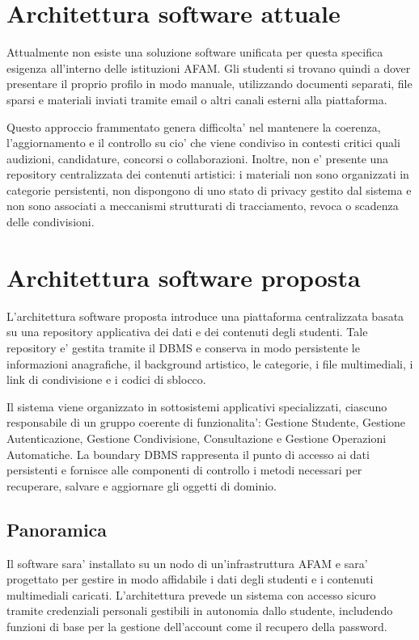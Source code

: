 \documentclass[12pt,a4paper]{article}
\begin{document}
\section{Architettura software attuale}
Attualmente non esiste una soluzione software unificata per questa specifica esigenza all'interno delle istituzioni AFAM. Gli studenti si trovano quindi a dover presentare il proprio profilo in modo manuale, utilizzando documenti separati, file sparsi e materiali inviati tramite email o altri canali esterni alla piattaforma.

Questo approccio frammentato genera difficolta' nel mantenere la coerenza, l'aggiornamento e il controllo su cio' che viene condiviso in contesti critici quali audizioni, candidature, concorsi o collaborazioni. Inoltre, non e' presente una repository centralizzata dei contenuti artistici: i materiali non sono organizzati in categorie persistenti, non dispongono di uno stato di privacy gestito dal sistema e non sono associati a meccanismi strutturati di tracciamento, revoca o scadenza delle condivisioni.

\section{Architettura software proposta}
L'architettura software proposta introduce una piattaforma centralizzata basata su una repository applicativa dei dati e dei contenuti degli studenti. Tale repository e' gestita tramite il DBMS e conserva in modo persistente le informazioni anagrafiche, il background artistico, le categorie, i file multimediali, i link di condivisione e i codici di sblocco.

Il sistema viene organizzato in sottosistemi applicativi specializzati, ciascuno responsabile di un gruppo coerente di funzionalita': Gestione Studente, Gestione Autenticazione, Gestione Condivisione, Consultazione e Gestione Operazioni Automatiche. La boundary DBMS rappresenta il punto di accesso ai dati persistenti e fornisce alle componenti di controllo i metodi necessari per recuperare, salvare e aggiornare gli oggetti di dominio.

\subsection{Panoramica}
Il software sara' installato su un nodo di un'infrastruttura AFAM e sara' progettato per gestire in modo affidabile i dati degli studenti e i contenuti multimediali caricati. L'architettura prevede un sistema con accesso sicuro tramite credenziali personali gestibili in autonomia dallo studente, includendo funzioni di base per la gestione dell'account come il recupero della password.
\end{document}
